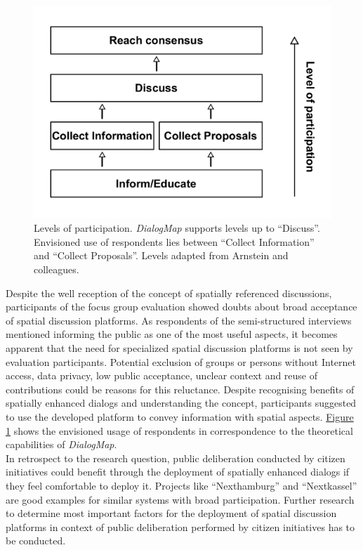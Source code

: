 \begin{figure}[!h]
    \centering
    \includegraphics[width=1\columnwidth]{images/my_ladder}
    \caption{Levels of participation. \textit{DialogMap} supports levels up to ``Discuss''. Envisioned use of respondents lies between ``Collect Information'' and ``Collect Proposals''. Levels adapted from Arnstein and colleagues.}
    \label{fig:my_ladder}
\end{figure}
Despite the well reception of the concept of spatially referenced discussions, participants of the focus group evaluation showed doubts about broad acceptance of spatial discussion platforms. As respondents of the semi-structured interviews mentioned informing the public as one of the most useful aspects, it becomes apparent that the need for specialized spatial discussion platforms is not seen by evaluation participants. Potential exclusion of groups or persons without Internet access, data privacy, low public acceptance, unclear context and reuse of contributions could be reasons for this reluctance.  Despite recognising benefits of spatially enhanced dialogs and understanding the concept, participants suggested to use the developed platform to convey information with spatial aspects. \hyperref[fig:my_ladder]{Figure \ref{fig:my_ladder}} shows the envisioned usage of respondents in correspondence to the theoretical capabilities of \textit{DialogMap}.\\
In retrospect to the research question, public deliberation conducted by citizen initiatives could benefit through the deployment of spatially enhanced dialogs if they feel comfortable to deploy it. Projects like ``Nexthamburg'' and ``Nextkassel'' are good examples for similar systems with broad participation. Further research to determine most important factors for the deployment of spatial discussion platforms in context of public deliberation performed by citizen initiatives has to be conducted.



